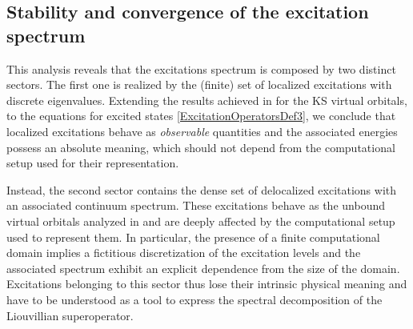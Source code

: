 \documentclass[reprint,aps,prb]{revtex4-1}
\newcommand{\dd}{{\rm d}}
\newcommand{\eps}{\epsilon}
\newcommand{\be}{\begin{equation}}
\newcommand{\ee}{\end{equation}}
\newcommand{\nn}{\notag}
\newcommand{\lb}{\label}
\newcommand{\op}[1]{\hat {#1}}
\newcommand{\commutator}[2]{\left[ {#1} , {#2} \right]}
\newcommand{\trace}[1]{\mathrm{tr}\left(#1\right)}
\newcommand{\dmnot}{\op{\rho}_0}
\begin{document}



\subsection{Stability and convergence of the excitation spectrum}

This analysis reveals that the excitations spectrum is composed by two distinct sectors. The first one is realized by the (finite) set of localized excitations with discrete eigenvalues. Extending 
the results achieved in \cite{boffi2016} for the KS virtual orbitals, to the equations for excited states \eqref{ExcitationOperatorsDef3}, we conclude that localized excitations behave as 
\emph{observable} quantities and the associated energies possess an absolute meaning, which should not depend from the computational setup used for their representation. 

Instead, the second sector contains the dense set of delocalized excitations with an associated continuum spectrum. These excitations behave as the unbound virtual orbitals analyzed in \cite{boffi2016} 
and are deeply affected by the computational setup used to represent them. In particular, the presence of a finite computational domain implies a fictitious discretization of the excitation levels and 
the associated spectrum exhibit an explicit dependence from the size of the domain. Excitations belonging to this sector thus lose their intrinsic physical meaning and have to be understood as a tool to 
express the spectral decomposition of the Liouvillian superoperator. 
\end{document}
